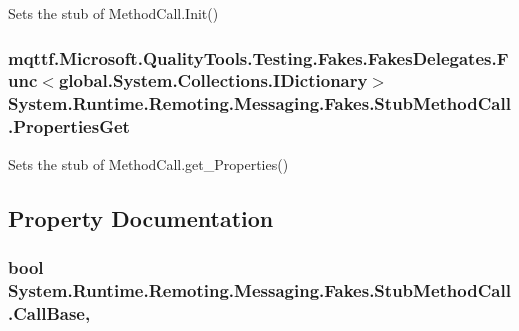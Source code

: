 Sets the stub of Method\-Call.\-Init()

\hypertarget{class_system_1_1_runtime_1_1_remoting_1_1_messaging_1_1_fakes_1_1_stub_method_call_a625673605f72dd18293713264a34cedf}{
\subsubsection[{Properties\-Get}]{\setlength{\rightskip}{0pt plus 5cm}mqttf.\-Microsoft.\-Quality\-Tools.\-Testing.\-Fakes.\-Fakes\-Delegates.\-Func$<$global.\-System.\-Collections.\-I\-Dictionary$>$ System.\-Runtime.\-Remoting.\-Messaging.\-Fakes.\-Stub\-Method\-Call.\-Properties\-Get}}\label{class_system_1_1_runtime_1_1_remoting_1_1_messaging_1_1_fakes_1_1_stub_method_call_a625673605f72dd18293713264a34cedf}


Sets the stub of Method\-Call.\-get\-\_\-\-Properties()



\subsection{Property Documentation}
\hypertarget{class_system_1_1_runtime_1_1_remoting_1_1_messaging_1_1_fakes_1_1_stub_method_call_abb4fdfed9703181d7a61ef7c6d69f3c6}{
\subsubsection[{Call\-Base}]{\setlength{\rightskip}{0pt plus 5cm}bool System.\-Runtime.\-Remoting.\-Messaging.\-Fakes.\-Stub\-Method\-Call.\-Call\-Base\hspace{0.3cm}{\ttfamily [get]}, {\ttfamily [set]}}}\label{class_system_1_1_runtime_1_1_remoting_1_1_messaging_1_1_fakes_1_1_stub_method_call_abb4fdfed9703181d7a61ef7c6d69f3c6}


